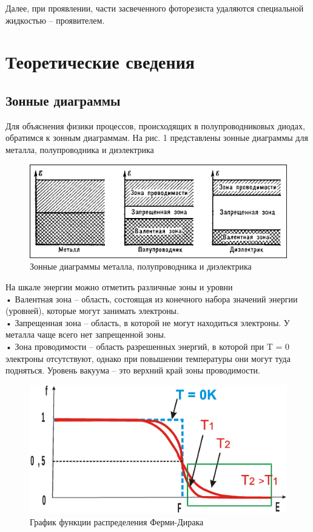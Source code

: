 \documentclass[a4paper,12pt]{article}
\begin{document}
Далее, при проявлении, части засвеченного фоторезиста удаляются специальной жидкостью -- проявителем.

\section{Теоретические сведения}

\subsection{Зонные диаграммы}
Для объяснения физики процессов, происходящих в полупроводниковых диодах, обратимся к зонным диаграммам. На рис. 1 представлены зонные диаграммы для металла, полупроводника и диэлектрика

\begin{figure}[h!]
	\begin{center}
	\includegraphics[scale = 0.4]{fig5}
	\caption{Зонные диаграммы металла, полупроводника и диэлектрика}
	\end{center}
\end{figure}

На шкале энергии можно отметить различные зоны и уровни \\
•	Валентная зона – область, состоящая из конечного набора значений энергии (уровней), которые могут занимать электроны.  \\
•	Запрещенная зона – область, в которой не могут находиться электроны. У металла чаще всего нет запрещенной зоны. \\
•	Зона проводимости – область разрешенных энергий, в которой при T = 0 электроны отсутствуют, однако при повышении температуры они могут туда подняться. Уровень вакуума – это верхний край зоны проводимости.  \\

\begin{figure}[h!]
	\begin{center}
	\includegraphics[scale = 0.2]{fig6}
	\caption{График функции распределения Ферми-Дирака}
	\end{center}
\end{figure}
\end{document}

